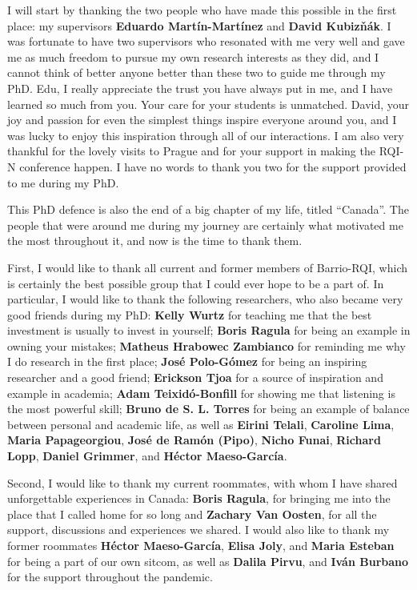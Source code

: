 \documentclass[letterpaper,12pt,titlepage,oneside,final]{book}
\begin{document}
I will start by thanking the two people who have made this possible in the first place: my supervisors \textbf{Eduardo Martín-Martínez} and \textbf{David Kubiz\v{n}ák}. I was fortunate to have two supervisors who resonated with me very well and gave me as much freedom to pursue my own research interests as they did, and I cannot think of better anyone better than these two to guide me through my PhD. Edu, I really appreciate the trust you have always put in me, and I have learned so much from you. Your care for your students is unmatched. David, your joy and passion for even the simplest things inspire everyone around you, and I was lucky to enjoy this inspiration through all of our interactions. I am also very thankful for the lovely visits to Prague and for your support in making the RQI-N conference happen. I have no words to thank you two for the support provided to me during my PhD. 

This PhD defence is also the end of a big chapter of my life, titled ``Canada''. The people that were around me during my journey are certainly what motivated me the most throughout it, and now is the time to thank them.

First, I would like to thank all current and former members of Barrio-RQI, which is certainly the best possible group that I could ever hope to be a part of. In particular, I would like to thank the following researchers, who also became very good friends during my PhD: \textbf{Kelly Wurtz} for teaching me that the best investment is usually to invest in yourself; \textbf{Boris Ragula} for being an example in owning your mistakes; \textbf{Matheus Hrabowec Zambianco} for reminding me why I do research in the first place; \textbf{José Polo-Gómez} for being an inspiring researcher and a good friend; \textbf{Erickson Tjoa} for a source of inspiration and example in academia; \textbf{Adam Teixidó-Bonfill} for showing me that listening is the most powerful skill; \textbf{Bruno de S. L. Torres} for being an example of balance between personal and academic life, as well as \textbf{Eirini Telali}, \textbf{Caroline Lima}, \textbf{Maria Papageorgiou}, \textbf{José de Ramón (Pipo)}, \textbf{Nicho Funai}, \textbf{Richard Lopp}, \textbf{Daniel Grimmer}, and \textbf{Héctor Maeso-García}.

Second, I would like to thank my current roommates, with whom I have shared unforgettable experiences in Canada: \textbf{Boris Ragula}, for bringing me into the place that I called home for so long and \textbf{Zachary Van Oosten}, for all the support, discussions and experiences we shared. I would also like to thank my former roommates \textbf{Héctor Maeso-García}, \textbf{Elisa Joly}, and \textbf{Maria Esteban} for being a part of our own sitcom, as well as \textbf{Dalila Pirvu}, and \textbf{Iván Burbano} for the support throughout the pandemic.
\end{document}
